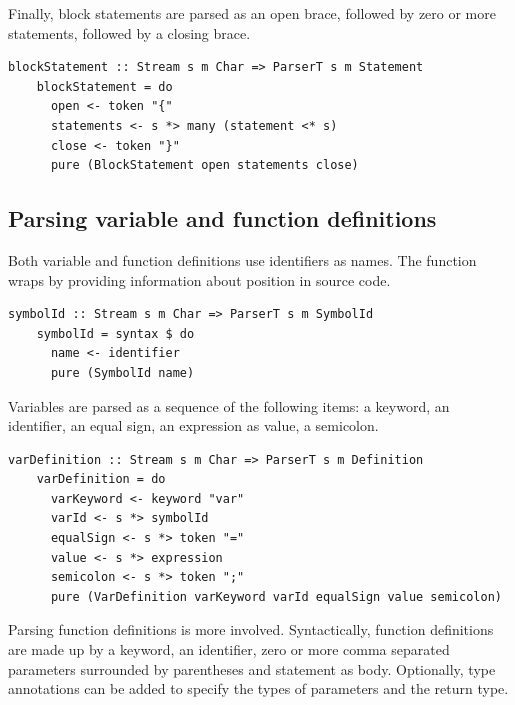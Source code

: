 \documentclass[UdineBachThesis,american,11pt,draft]{PhdThesis}
\begin{document}
  Finally, block statements are parsed as an open brace, followed by zero or
  more statements, followed by a closing brace.

  \begin{lstlisting}[gobble=4,basicstyle=\ttfamily\small]
    blockStatement :: Stream s m Char => ParserT s m Statement
    blockStatement = do
      open <- token "{"
      statements <- s *> many (statement <* s)
      close <- token "}"
      pure (BlockStatement open statements close)
  \end{lstlisting}

  \subsection{Parsing variable and function definitions}

  Both variable and function definitions use identifiers as names. The function
  \lstinline@symbolId@ wraps \lstinline@identifier@ by providing information
  about position in source code.

  \begin{lstlisting}[gobble=4,basicstyle=\ttfamily\small]
    symbolId :: Stream s m Char => ParserT s m SymbolId
    symbolId = syntax $ do
      name <- identifier
      pure (SymbolId name)
  \end{lstlisting}

  Variables are parsed as a sequence of the following items: a \lstinline@var@
  keyword, an identifier, an equal sign, an expression as value, a semicolon.

  \begin{lstlisting}[gobble=4,basicstyle=\ttfamily\small]
    varDefinition :: Stream s m Char => ParserT s m Definition
    varDefinition = do
      varKeyword <- keyword "var"
      varId <- s *> symbolId
      equalSign <- s *> token "="
      value <- s *> expression
      semicolon <- s *> token ";"
      pure (VarDefinition varKeyword varId equalSign value semicolon)
  \end{lstlisting}

  Parsing function definitions is more involved. Syntactically, function
  definitions are made up by a \lstinline@def@ keyword, an identifier, zero or
  more comma separated parameters surrounded by parentheses and statement as
  body. Optionally, type annotations can be added to specify the types of
  parameters and the return type.
\end{document}
